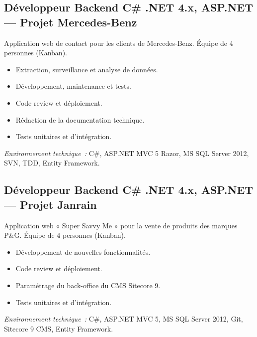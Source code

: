 \documentclass[10pt,a4paper]{article}
\begin{document}
\vspace{6pt}

\subsection*{Développeur Backend C\# .NET 4.x, ASP.NET --- Projet Mercedes-Benz}
\color{darkgray}
Application web de contact pour les clients de Mercedes-Benz. Équipe de 4 personnes (Kanban).
\begin{itemize}
  \item Extraction, surveillance et analyse de données.
  \item Développement, maintenance et tests.
  \item Code review et déploiement.
  \item Rédaction de la documentation technique.
  \item Tests unitaires et d'intégration.
\end{itemize}
\textit{Environnement technique~:} C\#, ASP.NET MVC 5 Razor, MS SQL Server 2012, SVN, TDD, Entity Framework.

\vspace{6pt}

\subsection*{Développeur Backend C\# .NET 4.x, ASP.NET --- Projet Janrain}
\color{darkgray}
Application web « Super Savvy Me » pour la vente de produits des marques P\&G. Équipe de 4 personnes (Kanban).
\begin{itemize}
  \item Développement de nouvelles fonctionnalités.
  \item Code review et déploiement.
  \item Paramétrage du back-office du CMS Sitecore 9.
  \item Tests unitaires et d'intégration.
\end{itemize}
\textit{Environnement technique~:} C\#, ASP.NET MVC 5, MS SQL Server 2012, Git, Sitecore 9 CMS, Entity Framework.

\vspace{6pt}
\end{document}
